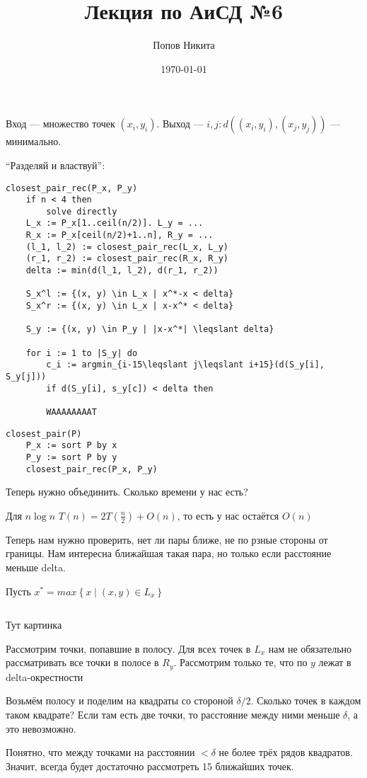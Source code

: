 \documentclass[11pt,a4paper]{article}
\title{Лекция по АиСД №6}
\date{\today}
\author{Попов Никита}
\begin{document}
\maketitle

Вход --- множество точек $(x_i, y_i)$. Выход --- $i, j: d((x_i, y_i), (x_j, y_j))$ --- минимально.

``Разделяй и властвуй'':

\begin{lstlisting}
closest_pair_rec(P_x, P_y)
    if n < 4 then
        solve directly
    L_x := P_x[1..ceil(n/2)]. L_y = ...
    R_x := P_x[ceil(n/2)+1..n], R_y = ...
    (l_1, l_2) := closest_pair_rec(L_x, L_y)
    (r_1, r_2) := closest_pair_rec(R_x, R_y)
    delta := min(d(l_1, l_2), d(r_1, r_2))
    
    S_x^l := {(x, y) \in L_x | x^*-x < delta}
    S_x^r := {(x, y) \in L_x | x-x^* < delta}

    S_y := {(x, y) \in P_y | |x-x^*| \leqslant delta}

    for i := 1 to |S_y| do
        c_i := argmin_{i-15\leqslant j\leqslant i+15}(d(S_y[i], S_y[j]))
        if d(S_y[i], s_y[c]) < delta then

        WAAAAAAAAT
\end{lstlisting}

\begin{lstlisting}
closest_pair(P)
    P_x := sort P by x
    P_y := sort P by y
    closest_pair_rec(P_x, P_y)
\end{lstlisting}

Теперь нужно объединить. Сколько времени у нас есть?

Для $n\log n$ $T(n) = 2T(\frac{n}{2}) + O(n)$, то есть у нас остаётся $O(n)$

Теперь нам нужно проверить, нет ли пары ближе, не по рзные стороны от границы. Нам интересна ближайшая такая пара, но только если расстояние меньше delta.

Пусть $x^* = max\left\{ x\mid(x, y)\in L_x \right\}$

\begin{lstlisting}
\end{lstlisting}

Тут картинка

Рассмотрим точки, попавшие в полосу. Для всех точек в $L_x$ нам не обязательно рассматривать все точки в полосе в $R_y$. Рассмотрим только те, что по $y$ лежат в delta-окрестности


Возьмём полосу и поделим на квадраты со стороной $\delta/2$. Сколько точек в каждом таком квадрате? Если там есть две точки, то расстояние между ними меньше $\delta$, а это невозможно.

Понятно, что между точками на расстоянии $<\delta$ не более трёх рядов квадратов. Значит, всегда будет достаточно рассмотреть 15 ближайших точек.
\end{document}
